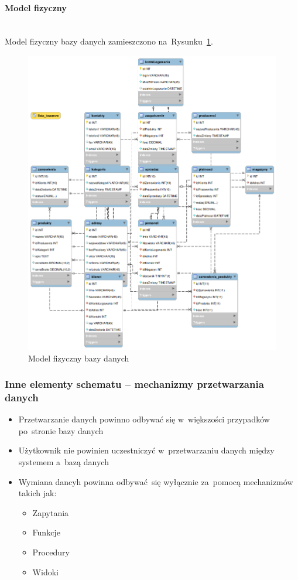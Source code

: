 \documentclass[a4paper, 12pt]{article}
\begin{document}
\paragraph{Model fizyczny} \mbox{}\\
Model fizyczny bazy danych zamieszczono na~Rysunku~\ref{fig:modelFizyczny}.
\begin{figure}[H]
	\includegraphics[width=14cm]{modelFizyczny.png}
	\caption[Model fizyczny bazy danych]{Model fizyczny bazy danych}
	\label{fig:modelFizyczny}
\end{figure}

\subsubsection{Inne elementy schematu – mechanizmy przetwarzania danych}
\begin{itemize}
\item Przetwarzanie danych powinno odbywać się w~większości przypadków po~stronie bazy danych
\item Użytkownik nie powinien uczestniczyć w~przetwarzaniu danych między systemem a~bazą danych
\item Wymiana dancyh powinna odbywać~się wyłącznie za~pomocą mechanizmów takich jak:
\begin{itemize}
\item Zapytania
\item Funkcje
\item Procedury
\item Widoki
\end{itemize}
\end{itemize}
\end{document}
